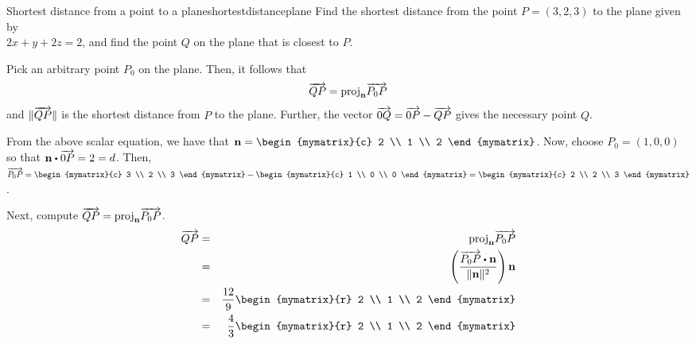 \begin{example}{Shortest distance from a point to a plane}{shortestdistanceplane}
Find the shortest distance from the point $P = (3,2,3)$ to the plane given by \\ $ 2x + y + 2z = 2$, and find the point $Q$ on the plane that is closest to $P$. 
\end{example}

\begin{solution}
Pick an arbitrary point $P_0$ on the plane. Then, it follows that
\[
\overrightarrow{QP} = \mbox{proj}_{{\bf n}}\overrightarrow{P_0P}
\]
and $\| \overrightarrow{QP} \|$ is the shortest distance from $P$ to the plane. Further, the vector $\overrightarrow{0Q} = \overrightarrow{0P} - \overrightarrow{QP}$ gives the necessary point $Q$. 

From the above scalar equation, we have that $\vect{n} = 
\begin{mymatrix}{c}
2 \\
1 \\
2 
\end{mymatrix}$. Now, choose $P_0 = (1, 0, 0)$ so that $\vect{n} \dotprod \longvect{0P} = 2 = d$. 
Then, $\longvect{P_0P} = \begin{mymatrix}{c}
3 \\
2 \\
3
\end{mymatrix}
- 
\begin{mymatrix}{c}
1 \\
0 \\
0
\end{mymatrix}
=
\begin{mymatrix}{c}
2 \\
2 \\
3
\end{mymatrix}$. 

Next, compute $\overrightarrow{QP} = \mbox{proj}_{{\bf n}}\overrightarrow{P_0P}$. 
\begin{eqnarray*}
\longvect{QP} &=& \func{proj}_{\vect{n}}\longvect{P_0P} \\
&=& \tup{\frac{ \longvect{P_0P} \dotprod \vect{n}}{\norm{\vect{n}} ^2}}\vect{n} \\
&=& \frac{12}{9} \begin{mymatrix}{r}
2 \\
1 \\
2
\end{mymatrix} \\
&=& \frac{4}{3} \begin{mymatrix}{r}
2 \\
1 \\
2
\end{mymatrix} 
\end{eqnarray*}


\end{solution}
